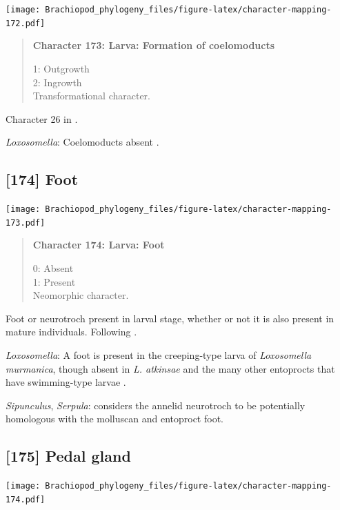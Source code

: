 \documentclass[openany]{book}
\begin{document}
\texttt{[image: Brachiopod\_phylogeny\_files/figure-latex/character-mapping-172.pdf]}

\begin{quote}
\textbf{Character 173: Larva: Formation of coelomoducts}

1: Outgrowth\\
2: Ingrowth\\
Transformational character.
\end{quote}

Character 26 in \citet{Haszprunar2000}.

\hypertarget{Loxosomella-coding-173}{}
\emph{Loxosomella}: Coelomoducts absent \citep{Haszprunar2000}.

\subsection*{{[}174{]} Foot}\label{foot-1}

\texttt{[image: Brachiopod\_phylogeny\_files/figure-latex/character-mapping-173.pdf]}

\begin{quote}
\textbf{Character 174: Larva: Foot}

0: Absent\\
1: Present\\
Neomorphic character.
\end{quote}

Foot or neurotroch present in larval stage, whether or not it is also
present in mature individuals. Following \citet{Wingstrand1985}.

\hypertarget{Loxosomella-coding-174}{}
\emph{Loxosomella}: A foot is present in the creeping-type larva of
\emph{Loxosomella} \emph{murmanica}, though absent in \emph{L. atkinsae}
and the many other entoprocts that have swimming-type larvae
\citep{Fuchs2008}.

\hypertarget{Serpula-coding-174}{}
\emph{Sipunculus}, \emph{Serpula}: \citet{Wingstrand1985} considers the
annelid neurotroch to be potentially homologous with the molluscan and
entoproct foot.

\subsection*{{[}175{]} Pedal gland}\label{pedal-gland}

\texttt{[image: Brachiopod\_phylogeny\_files/figure-latex/character-mapping-174.pdf]}
\end{document}
